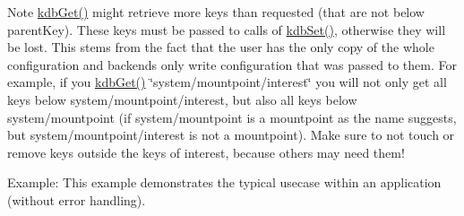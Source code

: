 \begin{DoxyNote}{Note}
\hyperlink{group__kdb_ga28e385fd9cb7ccfe0b2f1ed2f62453a1}{kdb\+Get()} might retrieve more keys than requested (that are not below parent\+Key). These keys must be passed to calls of \hyperlink{group__kdb_ga11436b058408f83d303ca5e996832bcf}{kdb\+Set()}, otherwise they will be lost. This stems from the fact that the user has the only copy of the whole configuration and backends only write configuration that was passed to them. For example, if you \hyperlink{group__kdb_ga28e385fd9cb7ccfe0b2f1ed2f62453a1}{kdb\+Get()} \char`\"{}system/mountpoint/interest\char`\"{} you will not only get all keys below system/mountpoint/interest, but also all keys below system/mountpoint (if system/mountpoint is a mountpoint as the name suggests, but system/mountpoint/interest is not a mountpoint). Make sure to not touch or remove keys outside the keys of interest, because others may need them!
\end{DoxyNote}
\begin{DoxyParagraph}{Example\+:}
This example demonstrates the typical usecase within an application (without error handling).
\end{DoxyParagraph}

